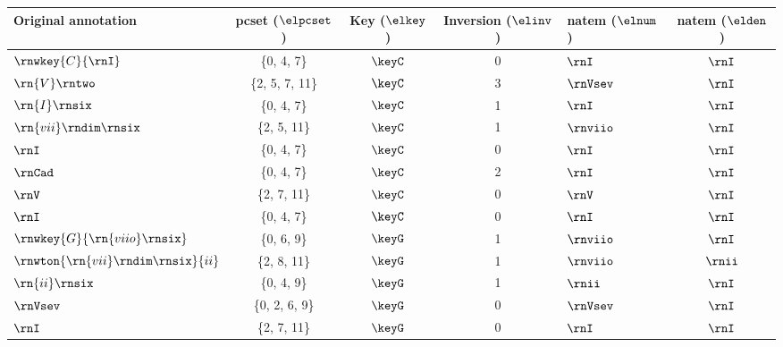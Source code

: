 \begin{tabular}{l|ccc|lc}
Original annotation                 & \gls{pcset} ($\elpcset$)         & Key ($\elkey$)   & Inversion ($\elinv$) & \gls{natem} ($\elnum$) & \gls{natem} ($\elden$) \\ \hline
$\rnwkey{C}{\rnI}$                  & \{0, 4, 7\}     & $\keyC$ & 0     & $\rnI$      & $\rnI$           \\
$\rn{V}\rntwo$                      & \{2, 5, 7, 11\} & $\keyC$ & 3     & $\rnVsev$   & $\rnI$           \\
$\rn{I}\rnsix$                      & \{0, 4, 7\}     & $\keyC$ & 1     & $\rnI$      & $\rnI$           \\
$\rn{vii}\rndim\rnsix$              & \{2, 5, 11\}    & $\keyC$ & 1     & $\rnviio$   & $\rnI$           \\
$\rnI$                              & \{0, 4, 7\}     & $\keyC$ & 0     & $\rnI$      & $\rnI$           \\
$\rnCad$                            & \{0, 4, 7\}     & $\keyC$ & 2     & $\rnI$      & $\rnI$           \\
$\rnV$                              & \{2, 7, 11\}    & $\keyC$ & 0     & $\rnV$      & $\rnI$           \\
$\rnI$                              & \{0, 4, 7\}     & $\keyC$ & 0     & $\rnI$      & $\rnI$           \\
$\rnwkey{G}{\rn{viio}\rnsix}$       & \{0, 6, 9\}     & $\keyG$ & 1     & $\rnviio$   & $\rnI$           \\
$\rnwton{\rn{vii}\rndim\rnsix}{ii}$ & \{2, 8, 11\}    & $\keyG$ & 1     & $\rnviio$   & $\rnii$          \\
$\rn{ii}\rnsix$                     & \{0, 4, 9\}     & $\keyG$ & 1     & $\rnii$     & $\rnI$           \\
$\rnVsev$                           & \{0, 2, 6, 9\}  & $\keyG$ & 0     & $\rnVsev$   & $\rnI$           \\
$\rnI$                              & \{2, 7, 11\}    & $\keyG$ & 0     & $\rnI$      & $\rnI$          
\end{tabular}
